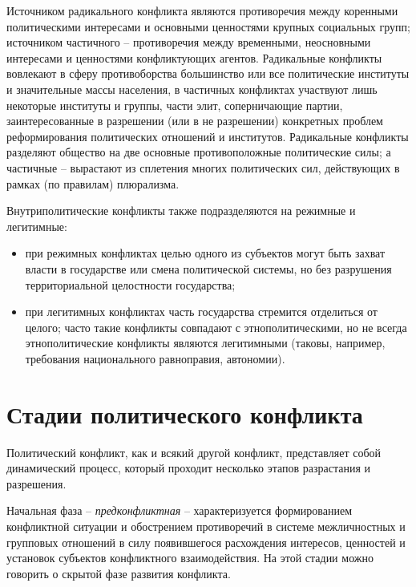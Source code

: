 Источником радикального конфликта являются противоречия между коренными
политическими интересами и основными ценностями крупных социальных групп;
источником частичного -- противоречия между временными, неосновными интересами
и ценностями конфликтующих агентов. Радикальные конфликты вовлекают в сферу
противоборства большинство или все политические институты и значительные массы
населения, в частичных конфликтах участвуют лишь некоторые институты и группы,
части элит, соперничающие партии, заинтересованные в разрешении (или в не
разрешении) конкретных проблем реформирования политических отношений и
институтов. Радикальные конфликты разделяют общество на две основные
противоположные политические силы; а частичные -- вырастают из сплетения многих
политических сил, действующих в рамках (по правилам) плюрализма.

Внутриполитические конфликты также подразделяются на режимные и легитимные:
\begin{itemize}
    \item при режимных конфликтах целью одного из субъектов могут быть захват
    власти в государстве или смена политической системы, но без разрушения
    территориальной целостности государства;
    \item при легитимных конфликтах часть государства стремится отделиться от
    целого; часто такие конфликты совпадают с этнополитическими, но не всегда
    этнополитические конфликты являются легитимными (таковы, например,
    требования национального равноправия, автономии).
\end{itemize}

\pagebreak %

\chapter{Стадии политического конфликта}

Политический конфликт, как и всякий другой конфликт, представляет собой
динамический процесс,  который проходит несколько этапов разрастания и
разрешения.

Начальная фаза -- \emph{предконфликтная} -- характеризуется формированием
конфликтной ситуации и обострением противоречий в системе межличностных и
групповых отношений в силу появившегося расхождения интересов, ценностей и
установок субъектов конфликтного взаимодействия. На этой стадии можно говорить
о скрытой фазе развития конфликта.


